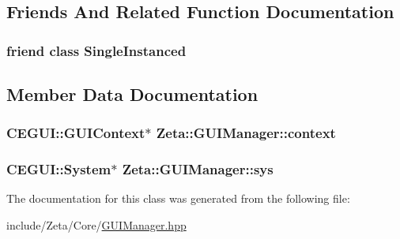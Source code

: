 \subsection{Friends And Related Function Documentation}
\hypertarget{classZeta_1_1GUIManager_a2fa95d69b32a77fffa4b730679a8b08c}{
\subsubsection[{Single\+Instanced}]{\setlength{\rightskip}{0pt plus 5cm}friend class {\bf Single\+Instanced}\hspace{0.3cm}{\ttfamily [friend]}}}\label{classZeta_1_1GUIManager_a2fa95d69b32a77fffa4b730679a8b08c}


\subsection{Member Data Documentation}
\hypertarget{classZeta_1_1GUIManager_a3b8922a1be0f73ace046033806c6e142}{
\subsubsection[{context}]{\setlength{\rightskip}{0pt plus 5cm}C\+E\+G\+U\+I\+::\+G\+U\+I\+Context$\ast$ Zeta\+::\+G\+U\+I\+Manager\+::context\hspace{0.3cm}{\ttfamily [private]}}}\label{classZeta_1_1GUIManager_a3b8922a1be0f73ace046033806c6e142}
\hypertarget{classZeta_1_1GUIManager_a670884c848cec41b709da2643da97772}{
\subsubsection[{sys}]{\setlength{\rightskip}{0pt plus 5cm}C\+E\+G\+U\+I\+::\+System$\ast$ Zeta\+::\+G\+U\+I\+Manager\+::sys\hspace{0.3cm}{\ttfamily [private]}}}\label{classZeta_1_1GUIManager_a670884c848cec41b709da2643da97772}


The documentation for this class was generated from the following file\+:\begin{DoxyCompactItemize}
\item 
include/\+Zeta/\+Core/\hyperlink{GUIManager_8hpp}{G\+U\+I\+Manager.\+hpp}\end{DoxyCompactItemize}
